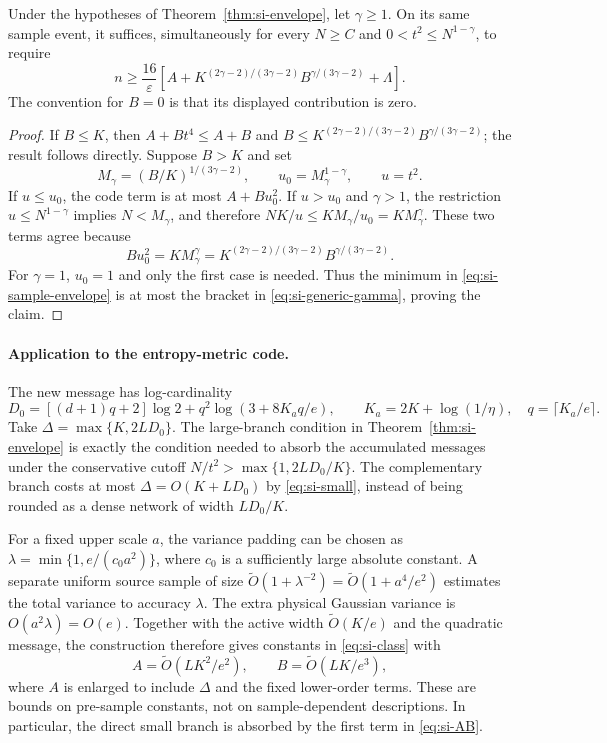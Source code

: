 \begin{corollary}
\label{cor:si-gamma}
Under the hypotheses of Theorem~\ref{thm:si-envelope}, let $\gamma\ge1$.
On its same sample event, it suffices, simultaneously for every $N\ge C$
and $0<t^2\le N^{1-\gamma}$, to require
\begin{equation}\label{eq:si-generic-gamma}
 n\ge\frac{16}{\varepsilon}
 \left[A+
   K^{(2\gamma-2)/(3\gamma-2)}
   B^{\gamma/(3\gamma-2)}+\Lambda\right].
\end{equation}
The convention for $B=0$ is that its displayed contribution is zero.
\end{corollary}
\begin{proof}
If $B\le K$, then $A+Bt^4\le A+B$ and
$B\le K^{(2\gamma-2)/(3\gamma-2)}B^{\gamma/(3\gamma-2)}$;
the result follows directly. Suppose $B>K$ and set
\[
 M_\gamma=(B/K)^{1/(3\gamma-2)},
 \qquad u_0=M_\gamma^{1-\gamma},
 \qquad u=t^2.
\]
If $u\le u_0$, the code term is at most $A+Bu_0^2$.
If $u>u_0$ and $\gamma>1$, the restriction
$u\le N^{1-\gamma}$ implies $N<M_\gamma$, and therefore
$NK/u\le KM_\gamma/u_0=KM_\gamma^\gamma$.
These two terms agree because
\[
 Bu_0^2=KM_\gamma^\gamma
       =K^{(2\gamma-2)/(3\gamma-2)}B^{\gamma/(3\gamma-2)}.
\]
For $\gamma=1$, $u_0=1$ and only the first case is needed.
Thus the minimum in \eqref{eq:si-sample-envelope} is at most the bracket
in \eqref{eq:si-generic-gamma}, proving the claim.
\end{proof}

\paragraph{Application to the entropy-metric code.}
The new message has log-cardinality
\[
 D_0=[(d+1)q+2]\log2+
       q^2\log(3+8K_aq/e),\qquad
 K_a=2K+\log(1/\eta),\quad q=\lceil K_a/e\rceil.
\]
Take $\Delta=\max\{K,2LD_0\}$. The large-branch condition in
Theorem~\ref{thm:si-envelope} is exactly the condition needed to absorb
the accumulated messages under the conservative cutoff
$N/t^2>\max\{1,2LD_0/K\}$.
The complementary branch costs at most $\Delta=O(K+LD_0)$ by
\eqref{eq:si-small}, instead of being rounded as a dense network of
width $LD_0/K$.

For a fixed upper scale $a$, the variance padding can be chosen as
$\lambda=\min\{1,e/(c_0a^2)\}$, where $c_0$ is a sufficiently large
absolute constant. A separate uniform source sample of size
$\widetilde O(1+\lambda^{-2})=
 \widetilde O(1+a^4/e^2)$ estimates the total variance to accuracy
$\lambda$. The extra physical Gaussian variance is $O(a^2\lambda)=O(e)$.
Together with the active width $\widetilde O(K/e)$ and the quadratic
message, the construction therefore gives constants in
\eqref{eq:si-class} with
\begin{equation}\label{eq:si-AB}
 A=\widetilde O(LK^2/e^2),\qquad
 B=\widetilde O(LK/e^3),
\end{equation}
where $A$ is enlarged to include $\Delta$ and the fixed lower-order terms.
These are bounds on pre-sample constants, not on sample-dependent
descriptions. In particular, the direct small branch is absorbed by
the first term in \eqref{eq:si-AB}.


